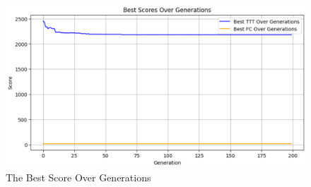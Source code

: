 \clearpage  %
\begin{figure}[H]  %
    \centering
    \includegraphics[width=\textwidth]{figures/Best_Score_Over_Generation.PNG}
    \caption{The Best Score Over Generations}
    \label{fig:Best_Score_Over_Generation}
\end{figure}








